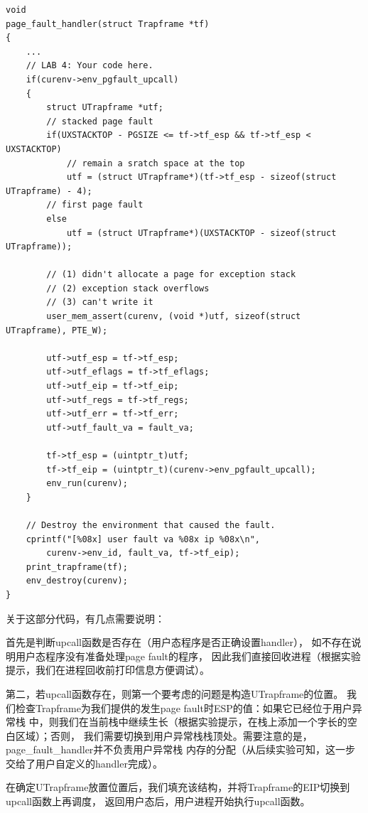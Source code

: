\documentclass[12pt, letterpaper]{report}
\begin{document}
\newpage
\lstset{style=CStyle}
\setmainfont{Consolas}
\begin{lstlisting}
void
page_fault_handler(struct Trapframe *tf)
{
    ...
    // LAB 4: Your code here.
    if(curenv->env_pgfault_upcall)
	{
		struct UTrapframe *utf;
		// stacked page fault
		if(UXSTACKTOP - PGSIZE <= tf->tf_esp && tf->tf_esp < UXSTACKTOP)
			// remain a sratch space at the top
			utf = (struct UTrapframe*)(tf->tf_esp - sizeof(struct UTrapframe) - 4);
		// first page fault
		else
			utf = (struct UTrapframe*)(UXSTACKTOP - sizeof(struct UTrapframe));

		// (1) didn't allocate a page for exception stack
		// (2) exception stack overflows
		// (3) can't write it
		user_mem_assert(curenv, (void *)utf, sizeof(struct UTrapframe), PTE_W);

		utf->utf_esp = tf->tf_esp;
		utf->utf_eflags = tf->tf_eflags;
		utf->utf_eip = tf->tf_eip;
		utf->utf_regs = tf->tf_regs;
		utf->utf_err = tf->tf_err;
		utf->utf_fault_va = fault_va;
		
		tf->tf_esp = (uintptr_t)utf;
		tf->tf_eip = (uintptr_t)(curenv->env_pgfault_upcall);
		env_run(curenv);
	}

    // Destroy the environment that caused the fault.
    cprintf("[%08x] user fault va %08x ip %08x\n",
        curenv->env_id, fault_va, tf->tf_eip);
    print_trapframe(tf);
    env_destroy(curenv);
}
\end{lstlisting}
\setmainfont{Times New Roman}

关于这部分代码，有几点需要说明：\par 
首先是判断upcall函数是否存在（用户态程序是否正确设置handler），
如不存在说明用户态程序没有准备处理page fault的程序，
因此我们直接回收进程（根据实验提示，我们在进程回收前打印信息方便调试）。\par 
第二，若upcall函数存在，则第一个要考虑的问题是构造UTrapframe的位置。
我们检查Trapframe为我们提供的发生page fault时ESP的值：如果它已经位于用户异常栈
中，则我们在当前栈中继续生长（根据实验提示，在栈上添加一个字长的空白区域）；否则，
我们需要切换到用户异常栈栈顶处。需要注意的是，page\_fault\_handler并不负责用户异常栈
内存的分配（从后续实验可知，这一步交给了用户自定义的handler完成）。\par 
在确定UTrapframe放置位置后，我们填充该结构，并将Trapframe的EIP切换到upcall函数上再调度，
返回用户态后，用户进程开始执行upcall函数。
\end{document}
